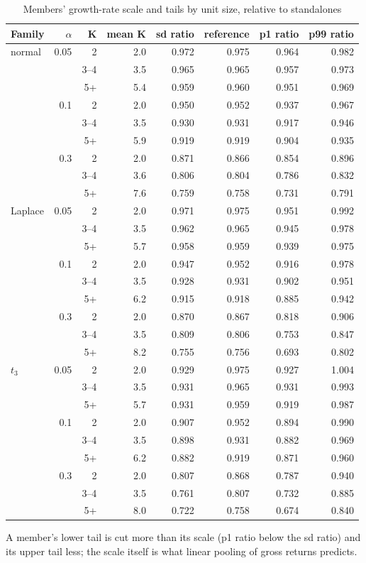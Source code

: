 \begin{table}[htbp]
\centering
\caption{Members' growth-rate scale and tails by unit size, relative to standalones}
\label{tab:a16b_growth_by_K}
\small
\begin{tabular}{lrrrrrrr}
\toprule
Family & $\alpha$ & K & mean K & sd ratio & reference & p1 ratio & p99 ratio \\
\midrule
normal & 0.05 & 2 & 2.0 & 0.972 & 0.975 & 0.964 & 0.982 \\
 &  & 3--4 & 3.5 & 0.965 & 0.965 & 0.957 & 0.973 \\
 &  & 5+ & 5.4 & 0.959 & 0.960 & 0.951 & 0.969 \\
 & 0.1 & 2 & 2.0 & 0.950 & 0.952 & 0.937 & 0.967 \\
 &  & 3--4 & 3.5 & 0.930 & 0.931 & 0.917 & 0.946 \\
 &  & 5+ & 5.9 & 0.919 & 0.919 & 0.904 & 0.935 \\
 & 0.3 & 2 & 2.0 & 0.871 & 0.866 & 0.854 & 0.896 \\
 &  & 3--4 & 3.6 & 0.806 & 0.804 & 0.786 & 0.832 \\
 &  & 5+ & 7.6 & 0.759 & 0.758 & 0.731 & 0.791 \\
Laplace & 0.05 & 2 & 2.0 & 0.971 & 0.975 & 0.951 & 0.992 \\
 &  & 3--4 & 3.5 & 0.962 & 0.965 & 0.945 & 0.978 \\
 &  & 5+ & 5.7 & 0.958 & 0.959 & 0.939 & 0.975 \\
 & 0.1 & 2 & 2.0 & 0.947 & 0.952 & 0.916 & 0.978 \\
 &  & 3--4 & 3.5 & 0.928 & 0.931 & 0.902 & 0.951 \\
 &  & 5+ & 6.2 & 0.915 & 0.918 & 0.885 & 0.942 \\
 & 0.3 & 2 & 2.0 & 0.870 & 0.867 & 0.818 & 0.906 \\
 &  & 3--4 & 3.5 & 0.809 & 0.806 & 0.753 & 0.847 \\
 &  & 5+ & 8.2 & 0.755 & 0.756 & 0.693 & 0.802 \\
$t_3$ & 0.05 & 2 & 2.0 & 0.929 & 0.975 & 0.927 & 1.004 \\
 &  & 3--4 & 3.5 & 0.931 & 0.965 & 0.931 & 0.993 \\
 &  & 5+ & 5.7 & 0.931 & 0.959 & 0.919 & 0.987 \\
 & 0.1 & 2 & 2.0 & 0.907 & 0.952 & 0.894 & 0.990 \\
 &  & 3--4 & 3.5 & 0.898 & 0.931 & 0.882 & 0.969 \\
 &  & 5+ & 6.2 & 0.882 & 0.919 & 0.871 & 0.960 \\
 & 0.3 & 2 & 2.0 & 0.807 & 0.868 & 0.787 & 0.940 \\
 &  & 3--4 & 3.5 & 0.761 & 0.807 & 0.732 & 0.885 \\
 &  & 5+ & 8.0 & 0.722 & 0.758 & 0.674 & 0.840 \\
\bottomrule
\end{tabular}
\par\smallskip\begin{minipage}{0.95\linewidth}\footnotesize A member's lower tail is cut more than its scale (p1 ratio below the sd ratio) and its upper tail less; the scale itself is what linear pooling of gross returns predicts.\end{minipage}
\end{table}
